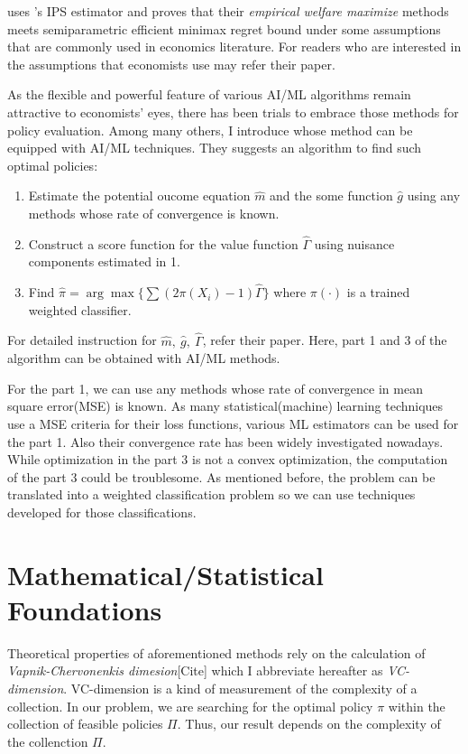 \documentclass[11pt]{article}
\begin{document}
	\cite{Kitagawa.2018} uses \cite{Dudik.2011}'s IPS estimator and proves that their \textit{empirical welfare maximize} methods meets semiparametric efficient minimax regret bound under some assumptions that are commonly used in economics literature. For readers who are interested in the assumptions that economists use may refer their paper.
	
	As the flexible and powerful feature of various AI/ML algorithms remain attractive to economists' eyes, there has been trials to embrace those methods for policy evaluation. Among many others, I introduce \cite{Athey.2017txo}  whose method can be equipped with AI/ML techniques. They suggests an algorithm to find such optimal policies:
	\begin{enumerate}
		\item Estimate the potential oucome equation $\hat{m}$ and the some function $\hat{g}$ using any methods whose rate of convergence is known.
		\item Construct a score function for the value function $\hat{\Gamma}$ using nuisance components estimated in 1.
		\item Find $\hat{\pi} = \arg \max \{ \sum (2\pi(X_i)-1) \hat{\Gamma} \} $ where $\pi(\cdot)$ is a trained weighted classifier.
	\end{enumerate}
For detailed instruction for $\hat{m},~\hat{g},~\hat{\Gamma}$, refer their paper. Here, part 1 and 3 of the algorithm can be obtained with AI/ML methods.

For the part 1, we can use any methods whose rate of convergence in mean square error(MSE) is known. As many statistical(machine) learning techniques use a MSE criteria for their loss functions, various ML estimators can be used for the part 1. Also their convergence rate has been widely investigated nowadays. While optimization in the part 3 is not a convex optimization, the computation of the part 3 could be troublesome. As mentioned before, the problem can be translated into a weighted classification problem so we can use techniques developed for those classifications.
	
	\section{Mathematical/Statistical Foundations}
	Theoretical properties of aforementioned methods rely on the calculation of \textit{Vapnik-Chervonenkis dimesion}[Cite] which I abbreviate hereafter as \textit{VC-dimension}. VC-dimension is a kind of measurement of the complexity of a collection. In our problem, we are searching for the optimal policy $\pi$ within the collection of feasible policies $\Pi$. Thus, our result depends on the complexity of the collenction $\Pi$.
	
\end{document}
